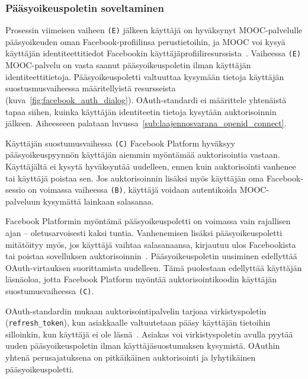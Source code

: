 \documentclass[finnish,gradu]{tktltiki}
\begin{document}

  \subsubsection{Pääsyoikeuspoletin soveltaminen} %
  \label{ssub:ensimmäisen_auktorisoinnin_jälkeen}

  Prosessin viimeisen vaiheen \verb!(E)! jälkeen käyttäjä on hyväksynyt MOOC-palvelulle pääsyoikeuden oman Facebook-profiilinsa perustietoihin, ja MOOC voi kysyä käyttäjän identiteettitiedot Facebookin käyttäjäprofiiliresurssista~\cite{facebook_graph_api_user}. Vaiheessa \verb!(E)! MOOC-palvelu on vasta saanut pääsyoikeuspoletin ilman käyttäjän identiteettitietoja. Pääsyoikeuspoletti valtuuttaa kysymään tietoja käyttäjän suostusmusvaiheessa määritellyistä resursseista (kuva~\ref{fig:facebook_auth_dialog}). OAuth-stan\-dardi ei määrittele yhtenäistä tapaa siihen, kuinka käyttäjän identiteetin tietoja kysytään auktorisoinnin jälkeen. Aiheeseeen palataan luvussa~\ref{sub:laajennosvarana_openid_connect}.

   Käyttäjän suostumusvaihessa \verb!(C)! Facebook Platform hyväksyy pääsyoikeuspyynnön käyttäjän aiemmin myöntämää auktorisointia vastaan. Käyttäjältä ei kysytä hyväksyntää uudelleen, ennen kuin auktorisointi vanhenee tai käyttäjä poistaa sen. Jos auktorisoinnin lisäksi myös käyttäjän oma Facebook-sessio on voimassa vaiheessa \verb!(B)!, käyttäjä voidaan autentikoida MOOC-palveluun kysymättä lainkaan salasanaa.

  Facebook Platformin myöntämä pääsyoikeuspoletti on voimassa vain rajallisen ajan -- oletusarvoisesti kaksi tuntia. Vanhenemisen lisäksi pääsyoikeuspoletti mitätöityy myös, jos käyttäjä vaihtaa salasanaansa, kirjautuu ulos Facebookista tai poistaa sovelluksen auktorisoinnin~\cite{facebook_oauth2_expired_tokens}. Pääsyoikeuspoletin uusiminen edellyttää OAuth-virtauksen suorittamista uudelleen. Tämä puolestaan edellyttää käyttäjän läsnäoloa, jotta Facebook Platform myöntää auktorisointikoodin käyttäjän suostumusvaiheessa \verb!(C)!.

  OAuth-standardin mukaan auktorisointipalvelin tarjoaa virkistyspoletin
  \\(\verb!refresh_token!), kun asiakkaalle valtuutetaan pääsy käyttäjän tietoihin silloinkin, kun käyttäjä ei ole läsnä~\cite{ietf_oauth2}. Asiakas voi virkistyspoletin avulla pyytää uuden pääsyoikeuspoletin ilman käyttäjäsuostumuksen kysymistä. OAuthin yhtenä perusajatuksena on pitkäikäinen auktorisointi ja lyhytikäinen pääsyoikeuspoletti.
\end{document}
